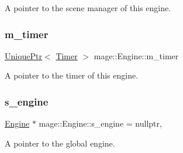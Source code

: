 A pointer to the scene manager of this engine. \hypertarget{classmage_1_1_engine_a4daac998928a6c087b310c52b3f26ae4}{}\label{classmage_1_1_engine_a4daac998928a6c087b310c52b3f26ae4} 
\subsubsection{\texorpdfstring{m\+\_\+timer}{m\_timer}}
{\footnotesize\ttfamily \hyperlink{namespacemage_a3316d7143a973e37adf1110f2e80ca31}{Unique\+Ptr}$<$ \hyperlink{classmage_1_1_timer}{Timer} $>$ mage\+::\+Engine\+::m\+\_\+timer\hspace{0.3cm}{\ttfamily [private]}}

A pointer to the timer of this engine. \hypertarget{classmage_1_1_engine_a95fd10c9b9dfe0fc9cbbcb441c910240}{}\label{classmage_1_1_engine_a95fd10c9b9dfe0fc9cbbcb441c910240} 
\subsubsection{\texorpdfstring{s\+\_\+engine}{s\_engine}}
{\footnotesize\ttfamily \hyperlink{classmage_1_1_engine}{Engine} $\ast$ mage\+::\+Engine\+::s\+\_\+engine = nullptr\hspace{0.3cm}{\ttfamily [static]}, {\ttfamily [private]}}

A pointer to the global engine. 